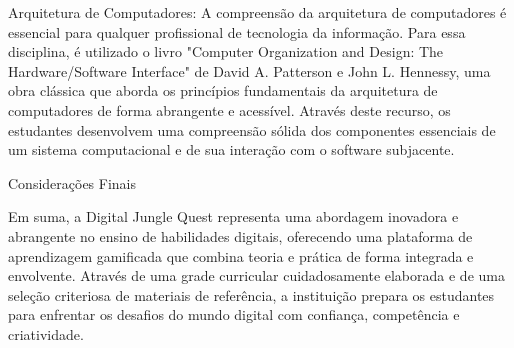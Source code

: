 Arquitetura de Computadores: A compreensão da arquitetura de computadores é essencial para qualquer profissional de tecnologia da informação. Para essa disciplina, é utilizado o livro "Computer Organization and Design: The Hardware/Software Interface" de David A. Patterson e John L. Hennessy, uma obra clássica que aborda os princípios fundamentais da arquitetura de computadores de forma abrangente e acessível. Através deste recurso, os estudantes desenvolvem uma compreensão sólida dos componentes essenciais de um sistema computacional e de sua interação com o software subjacente.

Considerações Finais

Em suma, a Digital Jungle Quest representa uma abordagem inovadora e abrangente no ensino de habilidades digitais, oferecendo uma plataforma de aprendizagem gamificada que combina teoria e prática de forma integrada e envolvente. Através de uma grade curricular cuidadosamente elaborada e de uma seleção criteriosa de materiais de referência, a instituição prepara os estudantes para enfrentar os desafios do mundo digital com confiança, competência e criatividade.